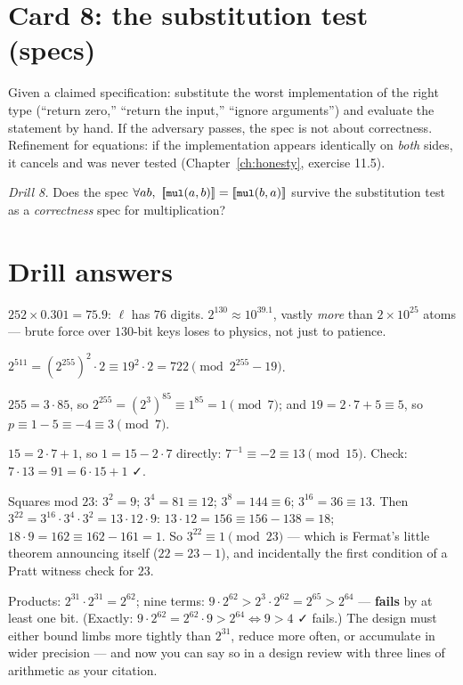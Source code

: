 \section{Card 8: the substitution test (specs)}

Given a claimed specification: substitute the worst implementation of
the right type (``return zero,'' ``return the input,'' ``ignore
arguments'') and evaluate the statement by hand. If the adversary
passes, the spec is not about correctness. Refinement for equations: if
the implementation appears identically on \emph{both} sides, it cancels
and was never tested (Chapter~\ref{ch:honesty}, exercise 11.5).

\emph{Drill 8.} Does the spec
$\forall a b,\ \denote{\code{mul}(a,b)} = \denote{\code{mul}(b,a)}$
survive the substitution test as a \emph{correctness} spec for
multiplication?

\section*{Drill answers}

 $252 \times 0.301 = 75.9$: $\ell$ has $76$ digits.
$2^{130} \approx 10^{39.1}$, vastly \emph{more} than $2 \times 10^{25}$
atoms --- brute force over $130$-bit keys loses to physics, not just to
patience.

 $2^{511} = (2^{255})^2 \cdot 2 \equiv 19^2 \cdot 2
= 722 \pmod{2^{255}-19}$.

 $255 = 3 \cdot 85$, so $2^{255} = (2^3)^{85} \equiv
1^{85} = 1 \pmod 7$; and $19 = 2 \cdot 7 + 5 \equiv 5$, so
$p \equiv 1 - 5 \equiv -4 \equiv 3 \pmod 7$.

 $15 = 2 \cdot 7 + 1$, so $1 = 15 - 2 \cdot 7$
directly: $7^{-1} \equiv -2 \equiv 13 \pmod{15}$. Check:
$7 \cdot 13 = 91 = 6 \cdot 15 + 1$ ✓.

 Squares mod $23$: $3^2 = 9$; $3^4 = 81 \equiv 12$;
$3^8 = 144 \equiv 6$; $3^{16} = 36 \equiv 13$. Then
$3^{22} = 3^{16} \cdot 3^{4} \cdot 3^{2} = 13 \cdot 12 \cdot 9$:
$13 \cdot 12 = 156 \equiv 156 - 138 = 18$; $18 \cdot 9 = 162 \equiv
162 - 161 = 1$. So $3^{22} \equiv 1 \pmod{23}$ --- which is Fermat's
little theorem announcing itself ($22 = 23 - 1$), and incidentally the
first condition of a Pratt witness check for $23$.

 Products: $2^{31} \cdot 2^{31} = 2^{62}$; nine terms:
$9 \cdot 2^{62} > 2^{3} \cdot 2^{62} = 2^{65} > 2^{64}$ --- \textbf{fails}
by at least one bit. (Exactly: $9 \cdot 2^{62} = 2^{62} \cdot 9
> 2^{64} \Leftrightarrow 9 > 4$ ✓ fails.) The design must either bound
limbs more tightly than $2^{31}$, reduce more often, or accumulate in
wider precision --- and now you can say so in a design review with three
lines of arithmetic as your citation.

